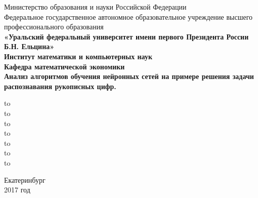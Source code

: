 \documentclass[oneside,final,14pt]{extreport}
\begin{document}
\begin{titlepage}
\newpage
\begin{center}
\hfill \break
\footnotesize{Министерство образования и науки Российской Федерации}\\ 
\footnotesize{Федеральное государственное автономное образовательное учреждение высшего профессионального образования}\\
\small{\textbf{«Уральский федеральный университет
имени первого Президента России Б.Н. Ельцина»}}\\
\hfill \break
\textbf{Институт математики и компьютерных наук}\\
 \hfill \break
\textbf{Кафедра математической экономики}\\
\hfill\break
\hfill \break
\hfill \break
\hfill \break
\LARGE\textbf{Анализ алгоритмов обучения нейронных сетей на примере решения задачи распознавания рукописных цифр.}\\
\end{center}

\vspace{6em}



\newbox{\lbox}
\newlength{\maxl}
\setlength{\maxl}{\wd\lbox}
\hfill\parbox{9cm}{
\hspace*{2cm} \hfill\hbox to\\
\hspace*{2cm} \hfill\hbox to\\
\hspace*{2cm} \hfill\hbox to\\
\hspace*{2cm} \hfill\hbox to\\
\hspace*{2cm} \hfill\hbox to\\
\hspace*{2cm} \hfill\hbox to\\
\hspace*{2cm} \hfill\hbox to\\
}


\vspace{\fill}
\hfill \break
\hfill \break
\hfill \break
\begin{center}
Екатеринбург \\2017 год
\end{center}

\end{titlepage}
\end{document}
